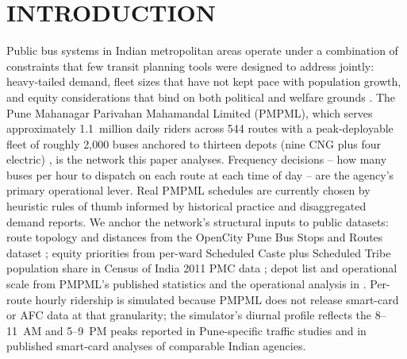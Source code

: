 \documentclass[a4paper,twoside]{article}
\begin{document}
\onecolumn \maketitle \normalsize \setcounter{footnote}{0} \vfill

\section{\uppercase{Introduction}}
\label{sec:introduction}

Public bus systems in Indian metropolitan areas operate under a
combination of constraints that few transit planning tools were
designed to address jointly: heavy-tailed demand, fleet sizes that
have not kept pace with population growth, and equity considerations
that bind on both political and welfare grounds
\cite{mahadevia2013brt,parisar2020comparison}. The Pune Mahanagar
Parivahan Mahamandal Limited (PMPML), which serves approximately
1.1~million daily riders across 544 routes with a peak-deployable
fleet of roughly 2{,}000 buses anchored to thirteen depots (nine
CNG plus four electric) \cite{itdp2024pmpml,ramaswamy2018pmpml},
is the network this paper analyses. Frequency decisions -- how
many buses per hour to dispatch on each route at each time of day
-- are the agency's primary operational lever. Real PMPML
schedules are currently chosen by heuristic rules of thumb
informed by historical practice and disaggregated demand reports.
We anchor the network's structural inputs to public datasets:
route topology and distances from the OpenCity Pune Bus Stops and
Routes dataset \cite{opencity2024pmpml,datameetpune}; equity
priorities from per-ward Scheduled Caste plus Scheduled Tribe
population share in Census of India 2011 PMC data
\cite{opencity2024census,census2011india}; depot list and
operational scale from PMPML's published statistics and the
operational analysis in \cite{ramaswamy2018pmpml}. Per-route
hourly ridership is simulated because PMPML does not release
smart-card or AFC data at that granularity; the simulator's
diurnal profile reflects the 8--11~AM and 5--9~PM peaks reported
in Pune-specific traffic studies and in published smart-card
analyses of comparable Indian agencies.
\end{document}
